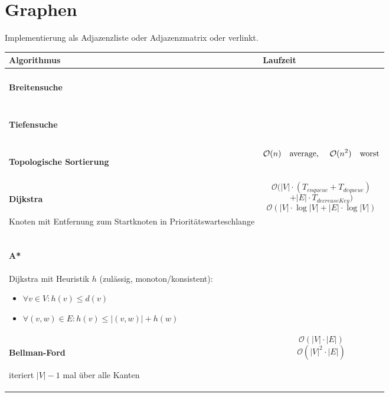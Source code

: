 \section{Graphen}
Implementierung als Adjazenzliste oder Adjazenzmatrix oder verlinkt.

\begin{center}
\begin{tabular}{|p{.4\linewidth}|p{.5\linewidth}|}
\hline
Algorithmus		& Laufzeit	\\\hline\hline
\paragraph{Breitensuche}
&
\\\hline
\paragraph{Tiefensuche}
&
\\\hline
\paragraph{Topologische Sortierung}
&
$$\mathcal{O}(n) \mbox{\quad average, \quad} \mathcal{O}(n^2) \mbox{\quad worst}$$
\\\hline\hline
\paragraph{Dijkstra}
Knoten mit Entfernung zum Startknoten in Prioritätswarteschlange
&
$$\mathcal{O}(|V| \cdot (T_{enqueue} + T_{dequeue})$$
$$ + |E| \cdot T_{decreaseKey})$$
$$\mathcal{O}(|V| \cdot \log |V| + |E| \cdot \log |V|)$$
\\\hline
\paragraph{A*}
Dijkstra mit Heuristik $h$ (zulässig, monoton/konsistent):
\begin{itemize}
\item $\forall v \in V: h(v) \leq d(v)$
\item $\forall (v, w) \in E: h(v) \leq |(v, w)| + h(w)$
\end{itemize}
&
\\\hline
\paragraph{Bellman-Ford}
iteriert $|V|-1$ mal über alle Kanten
&
$$\mathcal{O}(|V| \cdot |E|)$$
$$\mathcal{O}(|V|^2 \cdot |E|)$$
\\\hline

\end{tabular}
\end{center}
